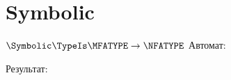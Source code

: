 \section{Symbolic}
\begin{frame}{$\Symbolic\TypeIs\MFATYPE\to\NFATYPE$}
	Автомат:

	Результат:

\end{frame}